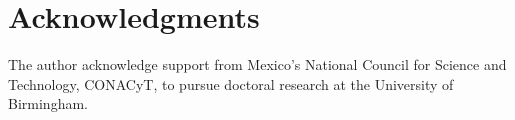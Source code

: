 \documentclass{sigchi}
\begin{document}
\section{Acknowledgments}
The author acknowledge support from Mexico's National Council 
for Science and Technology, CONACyT, to pursue doctoral research at the 
University of Birmingham.





% 
\end{document}
